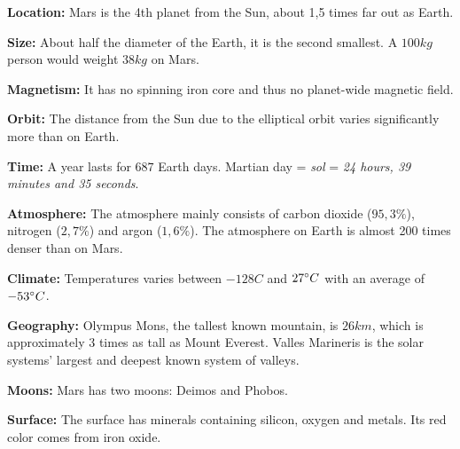 \begin{tcolorbox}[colback=red!5,colframe=DarkRed!40!black,title=Mars: 10 facts about the red planet]
\textbf{Location:} Mars is the 4th planet from the Sun, about 1,5 times far out as Earth.

\textbf{Size:} About half the diameter of the Earth, it is the second smallest. A $100 kg$ person would weight $38 kg$ on Mars.

\textbf{Magnetism:} It has no spinning iron core and thus no planet-wide magnetic field.

\textbf{Orbit:} The distance from the Sun due to the elliptical orbit varies significantly more than on Earth.

\textbf{Time:} A year lasts for $687$ Earth days. Martian day = \textit{sol} = \textit{24 hours, 39 minutes and 35 seconds}.

\textbf{Atmosphere:} The atmosphere mainly consists of carbon dioxide ($95,3 \%$), nitrogen ($2,7 \%$) and argon ($1,6\%$).
The atmosphere on Earth is almost 200 times denser than on Mars.

\textbf{Climate:} Temperatures varies between $-128C$ and $27 \degree C$ with an average of $-53 \degree C$.

\textbf{Geography:} Olympus Mons, the tallest known mountain, is $26 km$, which is approximately 3 times as tall as Mount Everest.
Valles Marineris is the solar systems' largest and deepest known system of valleys.

\textbf{Moons:} Mars has two moons: Deimos and Phobos.

\textbf{Surface:} The surface has minerals containing silicon, oxygen and metals. Its red color comes from iron oxide.
\end{tcolorbox}